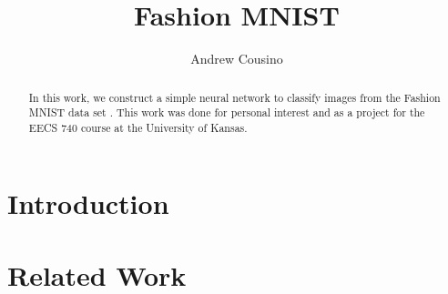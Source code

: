 \documentclass{IEEEtran}
\title{Fashion MNIST}
\author{Andrew Cousino}
\begin{document}
\maketitle

\begin{abstract}
In this work, we construct a simple neural network to classify images from the
Fashion MNIST data set \cite{xiao2017fashionmnist}. This work was done for
personal interest and as a project for the EECS 740 course at the University
of Kansas.
\end{abstract}

\section{Introduction}

\section{Related Work}


\end{document}
